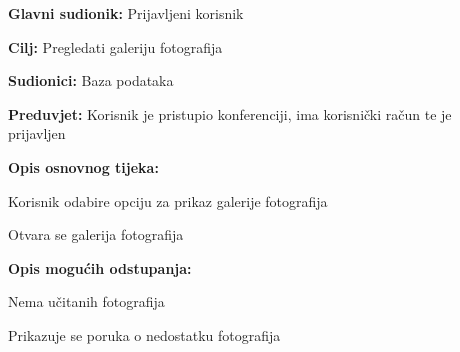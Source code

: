 					\noindent {}
					\begin{packed_item}
						
						\item \textbf{Glavni sudionik: } Prijavljeni korisnik
						\item  \textbf{Cilj:} Pregledati galeriju fotografija
						\item  \textbf{Sudionici:} Baza podataka
						\item  \textbf{Preduvjet:} Korisnik je pristupio konferenciji, ima korisnički račun te je prijavljen
						\item  \textbf{Opis osnovnog tijeka:}
						
						\item[] \begin{packed_enum}
							
							\item Korisnik odabire opciju za prikaz galerije fotografija
							\item Otvara se galerija fotografija
						\end{packed_enum}
						
						\item  \textbf{Opis mogućih odstupanja:}
						
						\item[] \begin{packed_item}
							\item[2.a] Nema učitanih fotografija
							\item[] \begin{packed_enum}			
								\item Prikazuje se poruka o nedostatku fotografija
							\end{packed_enum}
						\end{packed_item}
					\end{packed_item}
					

